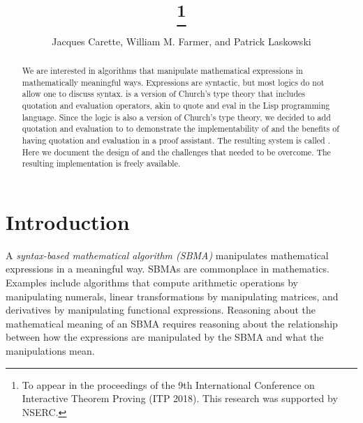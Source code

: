 \documentclass[fleqn]{llncs}
\title{{\HLQE}\thanks{To appear in the proceedings of the 9th
    International Conference on Interactive Theorem Proving (ITP
    2018).  This research was supported by NSERC.}}
\author{Jacques Carette, William M. Farmer, and Patrick Laskowski}
\institute{%
Computing and Software, McMaster University, Canada\\
\url{http://www.cas.mcmaster.ca/~carette}\\
\url{http://imps.mcmaster.ca/wmfarmer}\\[1.5ex]
17 June 2018
}
\begin{document}
\maketitle

\begin{abstract}
We are interested in algorithms that manipulate mathematical
expressions in mathematically meaningful ways. Expressions are
syntactic, but most logics do not allow one to discuss syntax.
{\churchqe} is a version of Church's type theory that includes
quotation and evaluation operators, akin to quote and eval
in the Lisp programming language.  Since the {\HOL} logic is also a
version of Church's type theory, we decided to add quotation and
evaluation to {\HL} to demonstrate the implementability of {\churchqe}
and the benefits of having quotation and evaluation in a proof
assistant.  The resulting system is called {\HLQE}.  Here we document
the design of {\HLQE} and the challenges that needed to be overcome.
The resulting implementation is freely available.
\end{abstract}

\iffalse 

\textbf{Keywords:} Church's type theory, quotation and evaluation, HOL
Light, proof assistants, symbolic computation, reasoning about syntax,
metareasoning, reflection, biform theories.

\fi

\section{Introduction}\label{sec:introduction}

A \emph{syntax-based mathematical algorithm (SBMA)} manipulates
mathematical expressions in a meaningful way.  SBMAs
are commonplace in mathematics.  Examples include algorithms that
compute arithmetic operations by manipulating numerals, linear
transformations by manipulating matrices, and derivatives by
manipulating functional expressions.  Reasoning about the mathematical
meaning of an SBMA requires reasoning about the relationship between
how the expressions are manipulated by the SBMA and what the
manipulations mean.
\end{document}

